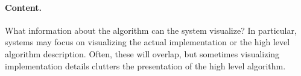 
\paragraph{Content.} What information about the algorithm can the system
visualize? In particular, systems may focus on visualizing the actual
implementation or the high level algorithm description. Often, these will
overlap, but sometimes visualizing implementation details clutters the
presentation of the high level algorithm.

